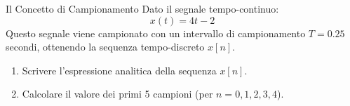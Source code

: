 
\begin{esercizio}{Il Concetto di Campionamento}
    Dato il segnale tempo-continuo:
    \[
        x(t) = 4t - 2
    \]
    Questo segnale viene campionato con un intervallo di campionamento $T = 0.25$ secondi, ottenendo la sequenza tempo-discreto $x[n]$.
    
    \begin{enumerate}
        \item Scrivere l'espressione analitica della sequenza $x[n]$.
        \item Calcolare il valore dei primi 5 campioni (per $n = 0, 1, 2, 3, 4$).
    \end{enumerate}
\end{esercizio}